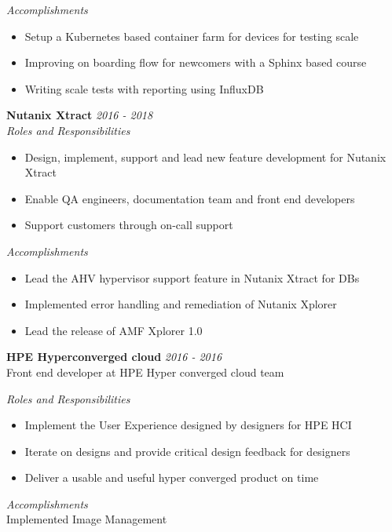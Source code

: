 \documentclass[line,margin]{res}
\begin{document}
\begin{resume}
{\it{Accomplishments}}\\
\begin{itemize}
\item Setup a Kubernetes based container farm for devices for testing scale
\item Improving on boarding flow for newcomers with a Sphinx based course
\item Writing scale tests with reporting using InfluxDB
\end{itemize}

{\bf Nutanix Xtract} \hfill {\it{2016 - 2018}}\\

{\it{Roles and Responsibilities}}\\
\begin{itemize}
\item Design, implement, support and lead new feature development for Nutanix Xtract
\item Enable QA engineers, documentation team and front end developers
\item Support customers through on-call support
\end{itemize}

{\it{Accomplishments}}\\
\begin{itemize}
\item Lead the AHV hypervisor support feature in Nutanix Xtract for DBs
\item Implemented error handling and remediation of Nutanix Xplorer
\item Lead the release of AMF Xplorer 1.0
\end{itemize}


{\bf HPE Hyperconverged cloud} \hfill {\it{2016 - 2016}}\\
Front end developer at HPE Hyper converged cloud team

{\it{Roles and Responsibilities}}\\
\begin{itemize}
\item Implement the User Experience designed by designers for HPE HCI
\item Iterate on designs and provide critical design feedback for designers
\item Deliver a usable and useful hyper converged product on time
\end{itemize}

{\it{Accomplishments}}\\
Implemented Image Management\\


\end{resume}
\end{document}
